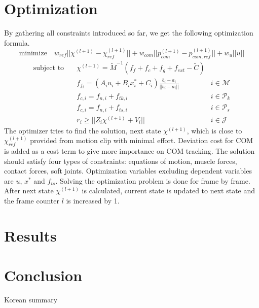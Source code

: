 \documentclass[master,english,final]{kaist-ucs}
\begin{document}
\chapter{Optimization}
By gathering all constraints introduced so far, we get the following optimization formula.
\begin{equation}
\text{minimize} \quad w_{ref} || \chi^{(l+1)} - \chi^{(l+1)}_{ref} || + w_{com} || p^{(l+1)}_{com} - p^{(l+1)}_{com,ref} || + w_u || u ||
\end{equation}
\begin{align}
\text{subject to} & \quad \chi^{(l+1)} = \tilde{M}^{-1} (f_f + f_c + f_g + f_{ext} - \tilde{C})     &                      \\
                  & \quad f_{f_i} = (A_i u_i + B_i x_i^* + C_i) \frac{b_i - a_i}{ || b_i - a_i || } & i \in \mathcal{M}    \\
                  & \quad f_{c,i} = f_{n,i} + f_{tk, i}                                             & i \in \mathcal{P}_k  \\
                  & \quad f_{c,i} = f_{n,i} + f_{ts, i}                                             & i \in \mathcal{P}_s  \\
                  & \quad r_i \geq || Z_i \chi^{(l+1)} + V_i ||                                     & i \in \mathcal{J}
\end{align}
The optimizer tries to find the solution, next state $\chi^{(l+1)}$, which is
close to $\chi^{(l+1)}_{ref}$ provided from motion clip with minimal effort.
Deviation cost for COM is added as a cost term to give more importance on COM tracking.
The solution should satisfy four types of constraints:
equations of motion, muscle forces, contact forces, soft joints.
Optimization variables excluding dependent variables are $u$, $x^*$ and $f_{ts}$.
Solving the optimization problem is done for frame by frame.
After next state $\chi^{(l+1)}$ is calculated, current state is updated to
next state and the frame counter $l$ is increased by 1.

\chapter{Results}

\chapter{Conclusion}


\begin{summary}

Korean summary

\end{summary}
\end{document}

